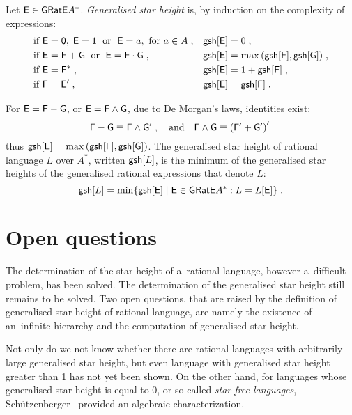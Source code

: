 \begin{defn}
    Let ${\mathsf{E}} \in {\mathsf{GRatE}} A^*$. \emph{Generalised star height} is, by induction on the complexity of expressions:
    \begin{align*}
        &\text{if } {\mathsf{E}} = {\mathsf{0}}, \; {\mathsf{E}} = {\mathsf{1}} \; \text{ or } \; {\mathsf{E}} = a, \text{ for } a \in A \; , & &{\mathsf{gs h}[{\mathsf{E}}]} = 0 \; , \\
        &\text{if } {\mathsf{E}} = {\mathsf{F}} + {\mathsf{G}} \; \text{ or } \; {\mathsf{E}} = {\mathsf{F}} \cdot {\mathsf{G}}\; , & &{\mathsf{gs h}[{\mathsf{E}}]} = \max{({\mathsf{gs h}[{\mathsf{F}}]}, {\mathsf{gs h}[{\mathsf{G}}]})} \; , \\
        &\text{if } {\mathsf{E}} = {\mathsf{F}}^* \; , & &{\mathsf{gs h}[{\mathsf{E}}]} = 1 + {\mathsf{gs h}[{\mathsf{F}}]} \; , \\
        &\text{if } {\mathsf{F}} = {\mathsf{E}}^{\prime} \; , & &{\mathsf{gs h}[{\mathsf{E}}]} = {\mathsf{gs h}[{\mathsf{F}}]} \; .
    \end{align*}
\end{defn}
For ${\mathsf{E}} = {\mathsf{F}} - {\mathsf{G}}$, or ${\mathsf{E}} = {\mathsf{F}} \wedge {\mathsf{G}}$, due to De Morgan's laws, identities exist:
\[
    {\mathsf{F}} - {\mathsf{G}} \equiv {\mathsf{F}} \wedge {\mathsf{G}}^{\prime} \; , \quad \text{and} \quad {\mathsf{F}} \wedge {\mathsf{G}} \equiv {({\mathsf{F}}^{\prime} + {\mathsf{G}}^{\prime})}^{\prime} \;
\]
thus ${\mathsf{gs h}[{\mathsf{E}}]} = \max{({\mathsf{gs h}[{\mathsf{F}}]}, {\mathsf{gs h}[{\mathsf{G}}]})}$. The generalised star height of rational language $L$ over $A^*$, written ${\mathsf{gs h}[L]}$, is the minimum of the generalised star heights of the generalised rational expressions that denote $L$:
\[
    {\mathsf{gs h}[L]} = \min \{ {\mathsf{gs h}[{\mathsf{E}}]} \mid {\mathsf{E}} \in {\mathsf{GRatE}} A^*: L = L[{\mathsf{E}}] \} \; .
\]

\section{Open questions}

The determination of the star height of a~rational language, however a~difficult problem, has been solved. The determination of the generalised star height still remains to be solved. Two open questions, that are raised by the definition of generalised star height of rational language, are namely the existence of an~infinite hierarchy and the computation of generalised star height.

Not only do we not know whether there are rational languages with arbitrarily large generalised star height, but even language with generalised star height greater than 1 has not yet been shown. On the other hand, for languages whose generalised star height is equal to 0, or so called \emph{star-free languages}, Schützenberger~\cite{Schutzenberger65} provided an algebraic characterization.